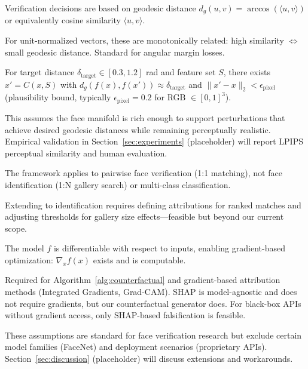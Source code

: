 \begin{assumption}
\label{assump:geodesic}
Verification decisions are based on geodesic distance $d_g(u,v) = \arccos(\langle u, v \rangle)$ or equivalently cosine similarity $\langle u, v \rangle$.
\end{assumption}

For unit-normalized vectors, these are monotonically related: high similarity $\Leftrightarrow$ small geodesic distance. Standard for angular margin losses.

\begin{assumption}
\label{assump:plausibility}
For target distance $\delta_{\text{target}} \in [0.3, 1.2]$ rad and feature set $S$, there exists $x' = C(x, S)$ with $d_g(f(x), f(x')) \approx \delta_{\text{target}}$ and $\|x' - x\|_2 < \epsilon_{\text{pixel}}$ (plausibility bound, typically $\epsilon_{\text{pixel}} = 0.2$ for RGB $\in [0,1]^3$).
\end{assumption}

This assumes the face manifold is rich enough to support perturbations that achieve desired geodesic distances while remaining perceptually realistic. Empirical validation in Section~\ref{sec:experiments} (placeholder) will report LPIPS perceptual similarity and human evaluation.

\begin{assumption}
\label{assump:verification}
The framework applies to pairwise face verification (1:1 matching), not face identification (1:N gallery search) or multi-class classification.
\end{assumption}

Extending to identification requires defining attributions for ranked matches and adjusting thresholds for gallery size effects—feasible but beyond our current scope.

\begin{assumption}[Differentiability]
\label{assump:differentiable}
The model $f$ is differentiable with respect to inputs, enabling gradient-based optimization: $\nabla_x f(x)$ exists and is computable.
\end{assumption}

Required for Algorithm~\ref{alg:counterfactual} and gradient-based attribution methods (Integrated Gradients, Grad-CAM). SHAP is model-agnostic and does not require gradients, but our counterfactual generator does. For black-box APIs without gradient access, only SHAP-based falsification is feasible.

These assumptions are standard for face verification research but exclude certain model families (FaceNet) and deployment scenarios (proprietary APIs). Section~\ref{sec:discussion} (placeholder) will discuss extensions and workarounds.
